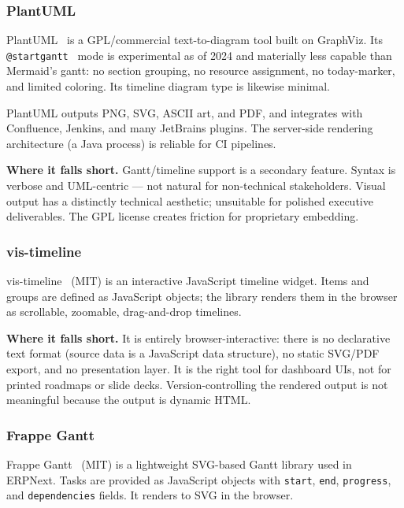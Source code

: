 \subsubsection{PlantUML}

PlantUML~\cite{plantuml} is a GPL/commercial text-to-diagram tool built on
GraphViz.  Its \texttt{@startgantt}~\cite{plantumlgantt} mode is experimental
as of 2024 and materially less capable than Mermaid's gantt: no section
grouping, no resource assignment, no today-marker, and limited coloring.
Its timeline diagram type is likewise minimal.

PlantUML outputs PNG, SVG, ASCII art, and PDF, and integrates with
Confluence, Jenkins, and many JetBrains plugins.  The server-side rendering
architecture (a Java process) is reliable for CI pipelines.

\medskip\noindent
\textbf{Where it falls short.}
Gantt/timeline support is a secondary feature.  Syntax is verbose and
UML-centric --- not natural for non-technical stakeholders.
Visual output has a distinctly technical aesthetic; unsuitable for polished
executive deliverables.
The GPL license creates friction for proprietary embedding.

\subsubsection{vis-timeline}

vis-timeline~\cite{vistimeline} (MIT) is an interactive JavaScript timeline
widget.  Items and groups are defined as JavaScript objects; the library
renders them in the browser as scrollable, zoomable, drag-and-drop timelines.

\medskip\noindent
\textbf{Where it falls short.}
It is entirely browser-interactive: there is no declarative text format
(source data is a JavaScript data structure), no static SVG/PDF export, and
no presentation layer.  It is the right tool for dashboard UIs, not for
printed roadmaps or slide decks.  Version-controlling the rendered output
is not meaningful because the output is dynamic HTML.

\subsubsection{Frappe Gantt}

Frappe Gantt~\cite{frappegantt} (MIT) is a lightweight SVG-based Gantt
library used in ERPNext.  Tasks are provided as JavaScript objects with
\texttt{start}, \texttt{end}, \texttt{progress}, and \texttt{dependencies}
fields.  It renders to SVG in the browser.

